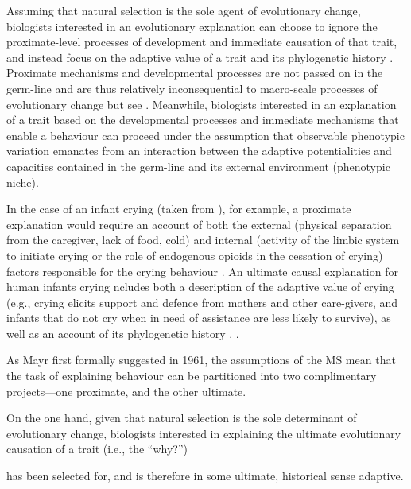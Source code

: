 Assuming that natural selection is the sole agent of evolutionary change, biologists interested in an evolutionary explanation can choose to ignore the proximate-level processes of development and immediate causation of that trait, and instead focus on the adaptive value of a trait and its phylogenetic history \citep{Mayr1961,Tinbergen1963}.  Proximate mechanisms and developmental processes are not passed on in the germ-line and are thus relatively inconsequential to macro-scale processes of evolutionary change \citep{Svensson2017} but see \citep{Laland2012,Laland2015}.  Meanwhile, biologists interested in an explanation of a trait based on the developmental processes and immediate mechanisms that enable a behaviour can proceed under the assumption that observable phenotypic variation emanates from an interaction between the adaptive potentialities and capacities contained in the germ-line and its external environment (phenotypic niche).


In the case of an infant crying (taken from \citep{Scott-Phillips2011,Nettle2009,Zeifman2001}), for example, a proximate explanation would require an account of both the external (physical separation from the caregiver, lack of food, cold) and internal (activity of the limbic system to initiate crying or the role of endogenous opioids in the cessation of crying) factors responsible for the crying behaviour \citep[38]{Scott-Phillips2011}. An ultimate causal explanation for human infants crying ncludes both a description of the adaptive value of crying (e.g., crying elicits support and defence from mothers and other care-givers, and infants that do not cry when in need of assistance are less likely to survive), as well as an account of its phylogenetic history \citep{Mayr1961,Tinbergen1963}.  \citep[38]{Scott-Phillips2011}.



As Mayr first formally suggested in 1961, the assumptions of the MS mean that the task of explaining behaviour can be partitioned into two complimentary projects---one proximate, and the other ultimate.








On the one hand, given that natural selection is the sole determinant of evolutionary change, biologists interested in explaining the ultimate evolutionary causation of a trait (i.e., the ``why?'')



 has been selected for, and is therefore in some ultimate, historical sense adaptive.





